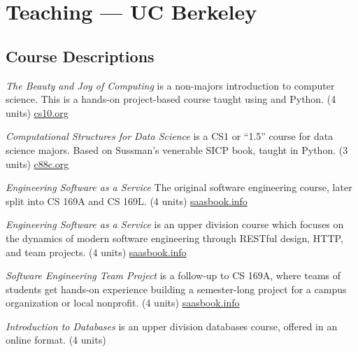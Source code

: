 \section{Teaching — UC Berkeley}

\vspace{6pt}

\subsection{Course Descriptions}

\vspace{5pt}
\begin{description}
    \setlength\itemsep{0.7em}
    \item[CS 10] \textit{The Beauty and Joy of Computing} is a non-majors introduction to computer science. This is a hands-on project-based course taught using \snap and Python.  (4 units) \small{\href{https://cs10.org}{cs10.org}} %
    
    \item[CS 88 / DATA C88C] \textit{Computational Structures for Data Science} is a CS1 or ``1.5'' course for data science majors. Based on Sussman's venerable SICP book, taught in Python. (3 units) \small{\href{https://c88c.org}{c88c.org}}

    \item[CS 169] \textit{Engineering Software as a Service} The original software engineering course, later split into CS 169A and CS 169L. (4 units) \small{\href{https://saasbook.info}{saasbook.info}}

    \item[CS 169A] \textit{Engineering Software as a Service} is an upper division course which focuses on the dynamics of modern software engineering through RESTful design, HTTP, and team projects. (4 units) \small{\href{https://saasbook.info}{saasbook.info}}

    \item[CS 169L] \textit{Software Engineering Team Project} is a follow-up to CS 169A, where teams of students get hands-on experience building a semester-long project for a campus organization or local nonprofit.  (4 units) \small{\href{https://saasbook.info}{saasbook.info}}
    
    \item[CS W186] \textit{Introduction to Databases} is an upper division databases course, offered in an online format.  (4 units)
    

\end{description}
